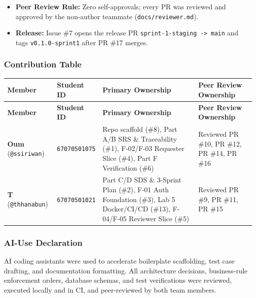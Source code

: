 \documentclass[11pt,a4paper]{article}
\begin{document}
\begin{itemize}[leftmargin=*,itemsep=2pt,topsep=2pt]
  \item \textbf{Peer Review Rule:} Zero self-approvals; every PR was reviewed and approved by the non-author teammate (\texttt{docs/reviewer.md}).
  \item \textbf{Release:} Issue \#7 opens the release PR \texttt{sprint-1-staging -> main} and tags \texttt{v0.1.0-sprint1} after PR \#17 merges.
\end{itemize}
\subsubsection{Contribution Table}
\vspace{0.3em}
\begin{longtable}{|>{\RaggedRight}p{2.8cm}|>{\centering\arraybackslash}p{2.2cm}|>{\RaggedRight}p{5.3cm}|>{\RaggedRight}p{4.4cm}|}
\hline
\rowcolor{zenPale}\textbf{Member} & \textbf{Student ID} & \textbf{Primary Ownership} & \textbf{Peer Review Ownership} \\ \hline
\endfirsthead
\hline
\rowcolor{zenPale}\textbf{Member} & \textbf{Student ID} & \textbf{Primary Ownership} & \textbf{Peer Review Ownership} \\ \hline
\endhead
\hline
\endfoot
\textbf{Oum} (\texttt{@ssiriwan}) & \texttt{67070501075} & Repo scaffold (\#8), Part A/B SRS \& Traceability (\#1), F-02/F-03 Requester Slice (\#4), Part F Verification (\#6) & Reviewed PR \#10, PR \#12, PR \#14, PR \#16 \\ \hline
\textbf{T} (\texttt{@thhanabun}) & \texttt{67070501021} & Part C/D SDS \& 3-Sprint Plan (\#2), F-01 Auth Foundation (\#3), Lab 5 Docker/CI/CD (\#13), F-04/F-05 Reviewer Slice (\#5) & Reviewed PR \#9, PR \#11, PR \#15 \\ \hline
\end{longtable}
\vspace{0.3em}

\subsubsection{AI-Use Declaration}
AI coding assistants were used to accelerate boilerplate scaffolding, test case drafting, and documentation formatting. All architecture decisions, business-rule enforcement orders, database schemas, and test verifications were reviewed, executed locally and in CI, and peer-reviewed by both team members.\\
\end{document}
